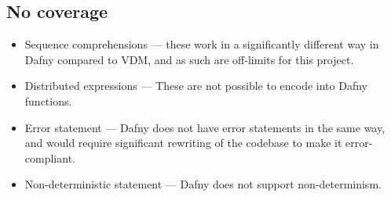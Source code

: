 \documentclass{entcs}
\begin{document}
\subsection{No coverage}
\begin{itemize}
    \item Sequence comprehensions --- these work in a significantly different way in Dafny compared to VDM, and as such are off-limits for this project.
    \item Distributed expressions --- These are not possible to encode into Dafny functions.
    
    \item Error statement --- Dafny does not have error statements in the same way, and would require significant rewriting of the codebase to make it error-compliant.
    \item Non-deterministic statement --- Dafny does not support non-determinism.
\end{itemize}
\end{document}
